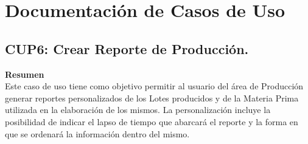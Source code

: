 \documentclass[10pt,spanish]{article}
\begin{document}
	\section{Documentación de Casos de Uso}

		\subsection{CUP6: Crear Reporte de Producción.}

		\textbf{\large Resumen}{\large }\\
		{Este caso de uso tiene como objetivo permitir al usuario del área de Producción generar reportes personalizados de los Lotes producidos  y de la Materia Prima utilizada en la elaboración de los mismos. La personalización incluye la posibilidad de indicar el lapso de tiempo que abarcará el reporte y la forma en que se ordenará la información dentro del mismo. }\\
		{\large \par}
\end{document}
